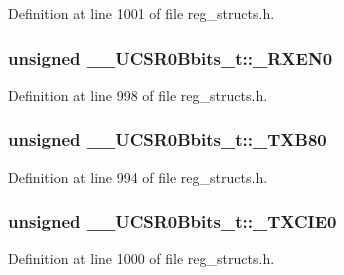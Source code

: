Definition at line 1001 of file reg\+\_\+structs.\+h.

\hypertarget{union_____u_c_s_r0_bbits__t_a9bfde5cd22b6df97082d8678c2b7a200}{
\subsubsection[{\+\_\+\+R\+X\+E\+N0}]{\setlength{\rightskip}{0pt plus 5cm}unsigned \+\_\+\+\_\+\+U\+C\+S\+R0\+Bbits\+\_\+t\+::\+\_\+\+R\+X\+E\+N0}}\label{union_____u_c_s_r0_bbits__t_a9bfde5cd22b6df97082d8678c2b7a200}


Definition at line 998 of file reg\+\_\+structs.\+h.

\hypertarget{union_____u_c_s_r0_bbits__t_a9a2ffda0c9c2404974d068080ba82186}{
\subsubsection[{\+\_\+\+T\+X\+B80}]{\setlength{\rightskip}{0pt plus 5cm}unsigned \+\_\+\+\_\+\+U\+C\+S\+R0\+Bbits\+\_\+t\+::\+\_\+\+T\+X\+B80}}\label{union_____u_c_s_r0_bbits__t_a9a2ffda0c9c2404974d068080ba82186}


Definition at line 994 of file reg\+\_\+structs.\+h.

\hypertarget{union_____u_c_s_r0_bbits__t_acc4eb2cb2de1e5cd5033cfdfa9580b7d}{
\subsubsection[{\+\_\+\+T\+X\+C\+I\+E0}]{\setlength{\rightskip}{0pt plus 5cm}unsigned \+\_\+\+\_\+\+U\+C\+S\+R0\+Bbits\+\_\+t\+::\+\_\+\+T\+X\+C\+I\+E0}}\label{union_____u_c_s_r0_bbits__t_acc4eb2cb2de1e5cd5033cfdfa9580b7d}


Definition at line 1000 of file reg\+\_\+structs.\+h.

